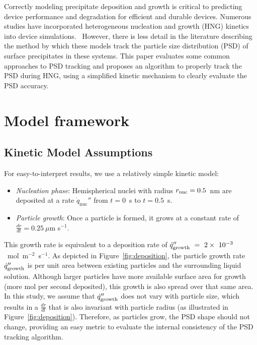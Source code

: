 \documentclass[final,3p,times,twocolumn, 12pt]{elsarticle}    %
\begin{document}
Correctly modeling precipitate deposition and  growth is critical to predicting device performance and degradation for efficient and durable devices. Numerous studies have incorporated heterogeneous nucleation and growth (HNG) kinetics into device simulations.~\cite{bib:Model_ex_1,bib:Model_ex_2,bib:Model_ex_3,bib:Model_ex_4,bib:Model_ex_5,bib:Model_ex_6, bib:Model_ex_7, bib:Model_ex_8,bib:Model_ex_9, bib:Model_ex_10} However, there is less detail in the literature describing the method by which these models track the particle size distribution (PSD) of surface precipitates in these systems. This paper evaluates some common approaches to PSD tracking and proposes an algorithm to properly track the PSD during HNG, using a simplified kinetic mechanism to clearly evaluate the PSD accuracy. 

\section{Model framework}
\label{sect:model-framework}
\subsection{Kinetic Model Assumptions}
For easy-to-interpret results, we use a relatively simple kinetic model:
\begin{itemize}
    \item \emph{Nucleation phase}: Hemispherical nuclei with radius $r_{\rm nuc}=0.5$~nm are deposited at a rate $\dot{q}_\mathrm{nuc}''$ from $t = 0$~s to $t = 0.5$~s.
    \item \emph{Particle growth}: Once a particle is formed, it grows at a constant rate of $\frac{dr}{dt} = 0.25~\mu$m s$^{-1}$.
\end{itemize}
This growth rate is equivalent to a deposition rate of $\dot{q}_{\rm growth}^{\prime\prime}~=~2\times~10^{-3}$~mol~m$^{-2}$~s$^{-1}$. As depicted in Figure~\ref{fig:deposition}, the particle growth rate $\dot{q}_{\rm growth}^{\prime\prime}$ is per unit area between existing particles and the surrounding liquid solution. Although larger particles have more available surface area for growth (more mol per second deposited), this growth is also spread over that same area. In this study, we assume that $\dot{q}_{\rm growth}^{\prime\prime}$ does not vary with particle size, which results in a $\frac{dr}{dt}$ that is also invariant with particle radius (as illustrated in Figure~\ref{fig:deposition}). Therefore, as particles grow, the PSD shape should not change, providing an easy metric to evaluate the internal consistency of the PSD tracking algorithm.
\end{document}
